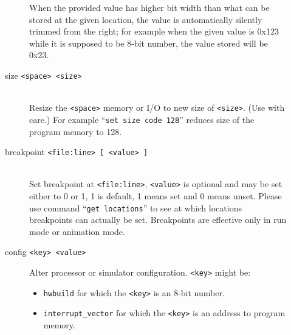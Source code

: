 \begin{description}
\begin{description}
                        When the provided value has higher bit width than what can be stored at the given location, the value is automatically silently trimmed from the right; for example when the given value is 0x123 while it is supposed to be 8-bit number, the value stored will be 0x23.
                    \item[size \texttt{<space> <size>}]~\\
                        Resize the \texttt{<space>} memory or I/O to new size of \texttt{<size>}. (Use with care.) For example ``\texttt{set size code 128}'' reduces size of the program memory to 128.
                    \item[breakpoint \texttt{<file:line> {[} <value> {]}}]~\\
                        Set breakpoint at \texttt{<file:line>}, \texttt{<value>} is optional and may be set either to 0 or 1, 1 is default, 1 means set and 0 means unset. Please use command ``\texttt{get locations}'' to see at which locations breakpoints can actually be set. Breakpoints are effective only in run mode or animation mode.
                    \item[config \texttt{<key> <value>}]
                        Alter processor or simulator configuration. \texttt{<key>} might be:
                            \begin{itemize}
                                \item \texttt{hwbuild} for which the \texttt{<key>} is an 8-bit number.
                                \item \texttt{interrupt\_vector} for which the \texttt{<key>} is an address to program memory.
                            \end{itemize}
                \end{description}


\end{description}
